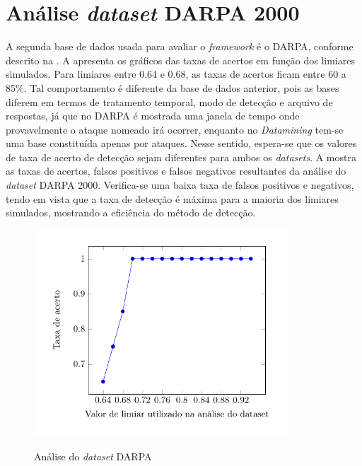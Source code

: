 \section{Análise \textit{dataset} DARPA 2000}
A segunda base de dados usada para avaliar o \textit{framework} é o DARPA, conforme descrito na .
A  apresenta os gráficos das taxas de acertos em função dos limiares simulados. Para limiares entre 0.64 e 0.68, as taxas de acertos ficam entre 60 a 85\%. Tal comportamento é diferente da base de dados anterior, pois as bases diferem em termos de tratamento temporal, modo de detecção e arquivo de respostas, já que no DARPA é mostrada uma janela de tempo onde provavelmente o ataque nomeado irá ocorrer, enquanto no \textit{Datamining} tem-se uma base constituída apenas por ataques. Nesse sentido, espera-se que os valores de taxa de acerto de detecção sejam diferentes para ambos os \textit{datasets}. A  mostra as taxas de acertos, falsos positivos e falsos negativos resultantes da análise do \textit{dataset} DARPA 2000. Verifica-se uma baixa taxa de falsos positivos e negativos, tendo em vista que a taxa de detecção é máxima para a maioria dos limiares simulados, mostrando a eficiência do método de detecção.       
 \begin{figure}[htb]
 	\centering
 	\caption{Análise do \textit{dataset} DARPA }
 	\includegraphics[width=0.85\textwidth]{figs/resultsDarpa.pdf}\\
 	\hspace{1.5cm}{Fonte: Elaborada pelo autor.}
 	\label{fig:ResultsDarpa}
 \end{figure}
 
